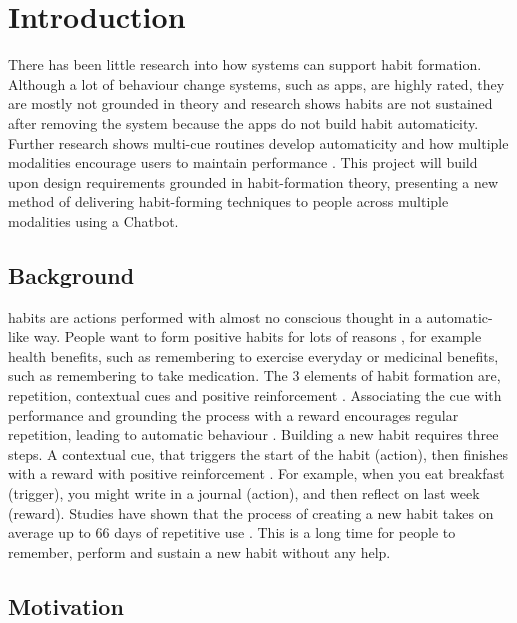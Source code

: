 
\section{Introduction}

There has been little research into how systems can support habit formation. Although a lot of behaviour change systems, such as apps, are highly rated, they are mostly not grounded in theory and research shows habits are not sustained after removing the system because the apps do not build habit automaticity. Further research shows multi-cue routines develop automaticity and how multiple modalities encourage users to maintain performance \cite{article_realtime_feedback_improving_medication_taking}.\newline
\newline
This project will build upon design requirements grounded in habit-formation theory, presenting a new method of delivering habit-forming techniques to people across multiple modalities using a Chatbot.

\subsection*{Background}
habits are actions performed with almost no conscious thought in a automatic-like way. People want to form positive habits for lots of reasons \cite{article_promoting_habit_formation}, for example health benefits, such as remembering to exercise everyday or medicinal benefits, such as remembering to take medication. The 3 elements of habit formation are, repetition, contextual cues and positive reinforcement \cite{article_beyond_self_tracking_designing_apps}. Associating the cue with performance and grounding the process with a reward encourages regular repetition, leading to automatic behaviour \cite{article_experiences_of_habit_formation}. Building a new habit requires three steps. A contextual cue, that triggers the start of the habit (action), then finishes with a reward with positive reinforcement \cite{article_beyond_self_tracking_designing_apps}. For example, when you eat breakfast (trigger), you might write in a journal (action), and then reflect on last week (reward). Studies have shown that the process of creating a new habit takes on average up to 66 days of repetitive use \cite{article_how_habits_formed_modelling_habit_formation}. This is a long time for people to remember, perform and sustain a new habit without any help.

\subsection*{Motivation}

